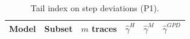 \begin{table}[t]
\centering
\begin{tabular}{lrrrrr}
\toprule
Model & Subset & $m$ traces & $\hat{\gamma}^H$ & $\hat{\gamma}^M$ & $\hat{\gamma}^{GPD}$ \\
\midrule
\bottomrule
\end{tabular}
\caption{Tail index on step deviations (P1).}
\label{tab:table1-activations-analysis}
\end{table}
